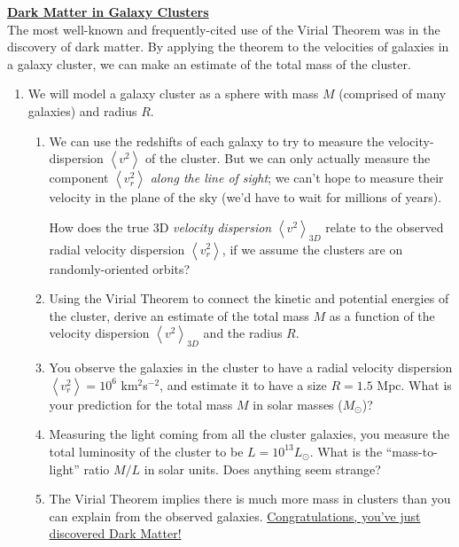 \documentclass[11pt]{article}
\renewcommand{\section}[1]{\textbf{\underline{#1}}}
\begin{document}
\section{Dark Matter in Galaxy Clusters}\\

The most well-known and frequently-cited use of the Virial Theorem was
in the discovery of dark matter. By applying the theorem to the
velocities of galaxies in a galaxy cluster, we can make an estimate of
the total mass of the cluster.

\begin{enumerate}
\item
  We will model a galaxy cluster as a sphere with mass $M$ (comprised
  of many galaxies) and radius $R$.
  \begin{enumerate}
  \item
    We can use the redshifts of each galaxy to try to measure the
    velocity-dispersion $\left<v^2\right>$ of the cluster. But we can
    only actually measure the component $\left<v_r^2\right>$
    \textit{along the line of sight}; we can't hope to measure their
    velocity in the plane of the sky (we'd have to wait for millions
    of years).

    How does the true 3D \textit{velocity dispersion}
    $\left<v^2\right>_{3D}$ relate to the observed radial velocity
    dispersion $\left<v_r^2\right>$, if we assume the clusters are on
    randomly-oriented orbits?
    
  \item
    Using the Virial Theorem to connect the kinetic and potential
    energies of the cluster, derive an estimate of the total mass $M$
    as a function of the velocity dispersion $\left<v^2\right>_{3D}$
    and the radius $R$.

  \item
    You observe the galaxies in the cluster to have a radial velocity
    dispersion $\left<v_r^2\right> = 10^6$ km$^2$s$^{-2}$, and estimate
    it to have a size $R = 1.5$ Mpc. What is your prediction for the
    total mass $M$ in solar masses ($M_\odot$)?

  \item
    Measuring the light coming from all the cluster galaxies, you
    measure the total luminosity of the cluster to be $L = 10^{13}
    L_\odot$. What is the ``mass-to-light'' ratio $M/L$ in solar
    units. Does anything seem strange?

  \item
    The Virial Theorem implies there is much more mass in clusters
    than you can explain from the observed
    galaxies. \underline{Congratulations, you've just discovered Dark
      Matter!}


\end{enumerate}
\end{enumerate}
\end{document}

